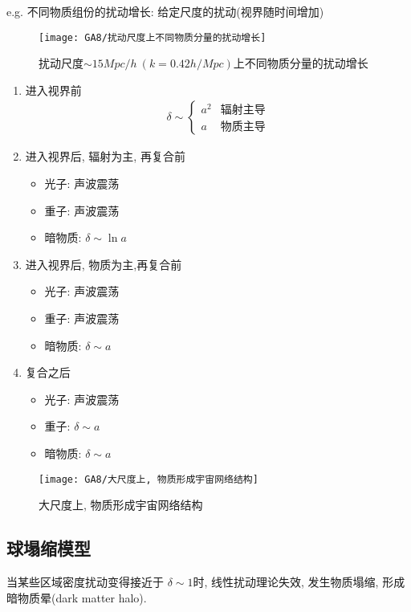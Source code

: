 e.g. 不同物质组份的扰动增长: 给定尺度的扰动(视界随时间增加)
\begin{figure}[!htb]
    \centering
    \texttt{[image: GA8/扰动尺度上不同物质分量的扰动增长]}
    \caption{扰动尺度$\sim 15Mpc/h\ (k=0.42h/Mpc)$上不同物质分量的扰动增长}
\end{figure}
\begin{enumerate}\small
    \item 进入视界前
    \begin{align*}
        \delta\sim\left\{\begin{array}{ll}
            a^2&\text{辐射主导}\\
            a &  \text{物质主导}
        \end{array} \right.
    \end{align*}
    \item 进入视界后, 辐射为主, 再复合前
    \begin{itemize}
        \item 光子: 声波震荡
        \item 重子: 声波震荡
        \item 暗物质: $\delta\sim \ln a$
    \end{itemize}
    \item 进入视界后, 物质为主,再复合前
    \begin{itemize}
        \item 光子: 声波震荡
        \item 重子: 声波震荡
        \item 暗物质: $\delta\sim a$
    \end{itemize}
    \item 复合之后
    \begin{itemize}
        \item 光子: 声波震荡
        \item 重子: $\delta\sim a$
        \item 暗物质: $\delta\sim a$
    \end{itemize}
\end{enumerate}

\begin{figure}[!htb]
    \centering
    \texttt{[image: GA8/大尺度上, 物质形成宇宙网络结构]}
    \caption{大尺度上, 物质形成宇宙网络结构}
\end{figure}

\subsection{球塌缩模型}
当某些区域密度扰动变得接近于 $\delta\sim 1$时, 线性扰动理论失效, 发生物质塌缩, 形成暗物质晕(dark matter halo). 

